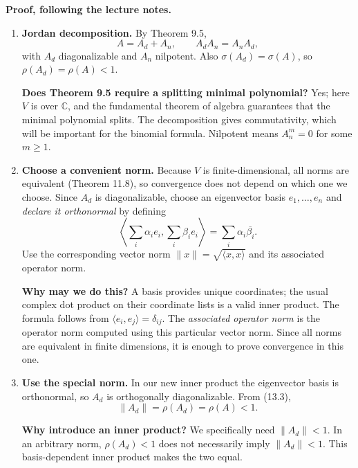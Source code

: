 \documentclass[11pt,a4paper]{article}
\newenvironment{proofsteps}{\begin{enumerate}\setlength{\itemsep}{4pt}}{\end{enumerate}}
\begin{document}
\textbf{Proof, following the lecture notes.}
\begin{proofsteps}
\item \textbf{Jordan decomposition.} By Theorem 9.5,
\[
 \boxed{A=A_d+A_n,\qquad A_dA_n=A_nA_d,}
\]
with \(A_d\) diagonalizable and \(A_n\) nilpotent. Also
\(\sigma(A_d)=\sigma(A)\), so \(\rho(A_d)=\rho(A)<1\).
\begin{personalnote}
\textbf{Does Theorem 9.5 require a splitting minimal polynomial?} Yes; here \(V\) is over \(\mathbb C\), and the fundamental theorem of algebra guarantees that the minimal polynomial splits. The decomposition gives commutativity, which will be important for the binomial formula. Nilpotent means \(A_n^m=0\) for some \(m\geq1\).
\end{personalnote}

\item \textbf{Choose a convenient norm.} Because \(V\) is finite-dimensional, all norms are equivalent (Theorem 11.8), so convergence does not depend on which one we choose. Since \(A_d\) is diagonalizable, choose an eigenvector basis \(e_1,\ldots,e_n\) and \emph{declare it orthonormal} by defining
\[
 \left\langle\sum_i\alpha_ie_i,\sum_i\beta_ie_i\right\rangle
 =\sum_i\alpha_i\overline{\beta_i}.
\]
Use the corresponding vector norm \(\|x\|=\sqrt{\langle x,x\rangle}\) and its associated operator norm.
\begin{personalnote}
\textbf{Why may we do this?} A basis provides unique coordinates; the usual complex dot product on their coordinate lists is a valid inner product. The formula follows from \(\langle e_i,e_j\rangle=\delta_{ij}\). The \emph{associated operator norm} is the operator norm computed using this particular vector norm. Since all norms are equivalent in finite dimensions, it is enough to prove convergence in this one.
\end{personalnote}

\item \textbf{Use the special norm.} In our new inner product the eigenvector basis is orthonormal, so \(A_d\) is orthogonally diagonalizable. From (13.3),
\[
 \boxed{\|A_d\|=\rho(A_d)=\rho(A)<1.}
\]
\begin{personalnote}
\textbf{Why introduce an inner product?} We specifically need \(\|A_d\|<1\). In an arbitrary norm, \(\rho(A_d)<1\) does not necessarily imply \(\|A_d\|<1\). This basis-dependent inner product makes the two equal.
\end{personalnote}


\end{proofsteps}
\end{document}
